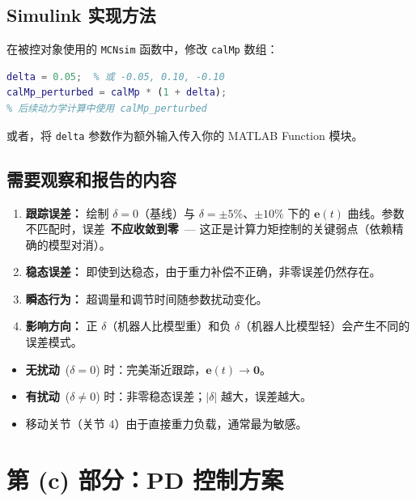 \documentclass[12pt,a4paper]{ctexart}
\begin{document}
\subsection{Simulink 实现方法}

在被控对象使用的 \texttt{MCNsim} 函数中，修改 \texttt{calMp} 数组：
\begin{lstlisting}[language=Matlab]
% 仅在 MCN_plant 中：
delta = 0.05;  % 或 -0.05, 0.10, -0.10
calMp_perturbed = calMp * (1 + delta);
% 后续动力学计算中使用 calMp_perturbed
\end{lstlisting}

或者，将 \texttt{delta} 参数作为额外输入传入你的 MATLAB Function 模块。

\subsection{需要观察和报告的内容}

\begin{enumerate}[leftmargin=*]
  \item \textbf{跟踪误差：} 绘制 $\delta=0$（基线）与 $\delta=\pm 5\%$、$\pm 10\%$ 下的 $\mathbf{e}(t)$ 曲线。参数不匹配时，误差\ \textbf{不应收敛到零}\ --- 这正是计算力矩控制的关键弱点（依赖精确的模型对消）。
  \item \textbf{稳态误差：} 即使到达稳态，由于重力补偿不正确，非零误差仍然存在。
  \item \textbf{瞬态行为：} 超调量和调节时间随参数扰动变化。
  \item \textbf{影响方向：} 正 $\delta$（机器人比模型重）和负 $\delta$（机器人比模型轻）会产生不同的误差模式。
\end{enumerate}

\begin{resultbox}[预期结果]
\begin{itemize}
  \item \textbf{无扰动}\ ($\delta = 0$) 时：完美渐近跟踪，$\mathbf{e}(t) \to \mathbf{0}$。
  \item \textbf{有扰动}\ ($\delta \neq 0$) 时：非零稳态误差；$|\delta|$ 越大，误差越大。
  \item 移动关节（关节 4）由于直接重力负载，通常最为敏感。
\end{itemize}
\end{resultbox}

\section{第 (c) 部分：PD 控制方案}
\end{document}
